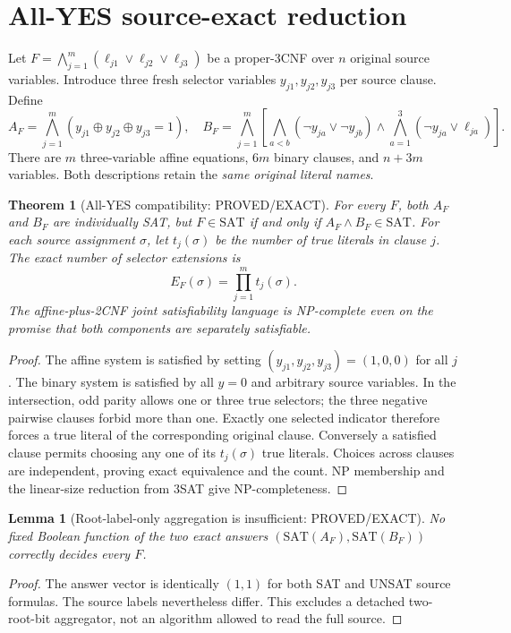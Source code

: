 \documentclass[11pt]{article}
\newtheorem{theorem}{Theorem}
\newtheorem{lemma}{Lemma}
\begin{document}
\section{All-YES source-exact reduction}
Let $F=\bigwedge_{j=1}^m(\ell_{j1}\vee\ell_{j2}\vee\ell_{j3})$ be a proper-3CNF over $n$ original source variables. Introduce three fresh selector variables $y_{j1},y_{j2},y_{j3}$ per source clause. Define
\[
A_F=\bigwedge_{j=1}^m (y_{j1}\oplus y_{j2}\oplus y_{j3}=1),
\quad
B_F=\bigwedge_{j=1}^m
\left[\bigwedge_{a<b}(\neg y_{ja}\vee\neg y_{jb})
\wedge\bigwedge_{a=1}^3(\neg y_{ja}\vee\ell_{ja})\right].
\]
There are $m$ three-variable affine equations, $6m$ binary clauses, and $n+3m$ variables. Both descriptions retain the \emph{same original literal names}.
\begin{theorem}[All-YES compatibility: PROVED/EXACT]
For every $F$, both $A_F$ and $B_F$ are individually SAT, but
$F\in\mathrm{SAT}$ if and only if $A_F\wedge B_F\in\mathrm{SAT}$.
For each source assignment $\sigma$, let $t_j(\sigma)$ be the number of true literals in clause $j$. The exact number of selector extensions is
\[
E_F(\sigma)=\prod_{j=1}^m t_j(\sigma).
\]
The affine-plus-2CNF joint satisfiability language is NP-complete even on the promise that both components are separately satisfiable.
\end{theorem}
\begin{proof}
The affine system is satisfied by setting $(y_{j1},y_{j2},y_{j3})=(1,0,0)$ for all $j$. The binary system is satisfied by all $y=0$ and arbitrary source variables. In the intersection, odd parity allows one or three true selectors; the three negative pairwise clauses forbid more than one. Exactly one selected indicator therefore forces a true literal of the corresponding original clause. Conversely a satisfied clause permits choosing any one of its $t_j(\sigma)$ true literals. Choices across clauses are independent, proving exact equivalence and the count. NP membership and the linear-size reduction from 3SAT give NP-completeness.
\end{proof}
\begin{lemma}[Root-label-only aggregation is insufficient: PROVED/EXACT]
No fixed Boolean function of the two exact answers
$(\mathrm{SAT}(A_F),\mathrm{SAT}(B_F))$ correctly decides every $F$.
\end{lemma}
\begin{proof}
The answer vector is identically $(1,1)$ for both SAT and UNSAT source formulas. The source labels nevertheless differ. This excludes a detached two-root-bit aggregator, not an algorithm allowed to read the full source.
\end{proof}
\end{document}
